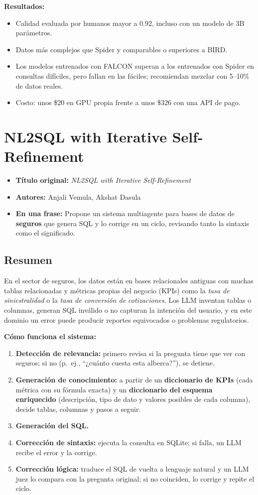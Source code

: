 \documentclass[11pt,a4paper]{article}
\newcommand{\ficha}[5]{%
  \begin{itemize}[leftmargin=*, label={}]
    \item \textbf{Título original:} \textit{#1}
    \item \textbf{Autores:} #2
    \item \textbf{En una frase:} #5
  \end{itemize}
}
\begin{document}
\textbf{Resultados:}
\begin{itemize}
  \item Calidad evaluada por humanos mayor a 0.92, incluso con un modelo de 3B parámetros.
  \item Datos más complejos que Spider y comparables o superiores a BIRD.
  \item Los modelos entrenados con FALCON superan a los entrenados con Spider en consultas difíciles, pero fallan en las fáciles; recomiendan mezclar con 5--10\% de datos reales.
  \item Costo: unos \$20 en GPU propia frente a unos \$326 con una API de pago.
\end{itemize}

\section{NL2SQL with Iterative Self-Refinement}
\ficha
  {NL2SQL with Iterative Self-Refinement}
  {Anjali Vemula, Akshat Dasula}
  {University of Minnesota -- Twin Cities}
  {arXiv:2610.22968 (preprint), octubre 2026}
  {Propone un sistema multiagente para bases de datos de \textbf{seguros} que genera SQL y lo corrige en un ciclo, revisando tanto la sintaxis como el significado.}

\subsection*{Resumen}
En el sector de seguros, los datos están en bases relacionales antiguas con muchas tablas relacionadas y métricas propias del negocio (KPIs) como la \textit{tasa de siniestralidad} o la \textit{tasa de conversión de cotizaciones}. Los LLM inventan tablas o columnas, generan SQL inválido o no capturan la intención del usuario, y en este dominio un error puede producir reportes equivocados o problemas regulatorios.

\textbf{Cómo funciona el sistema:}
\begin{enumerate}
  \item \textbf{Detección de relevancia:} primero revisa si la pregunta tiene que ver con seguros; si no (p.\ ej., ``¿cuánto cuesta esta alberca?''), se detiene.
  \item \textbf{Generación de conocimiento:} a partir de un \textbf{diccionario de KPIs} (cada métrica con su fórmula exacta) y un \textbf{diccionario del esquema enriquecido} (descripción, tipo de dato y valores posibles de cada columna), decide tablas, columnas y pasos a seguir.
  \item \textbf{Generación del SQL.}
  \item \textbf{Corrección de sintaxis:} ejecuta la consulta en SQLite; si falla, un LLM recibe el error y la corrige.
  \item \textbf{Corrección lógica:} traduce el SQL de vuelta a lenguaje natural y un LLM juez lo compara con la pregunta original; si no coinciden, lo corrige y repite el ciclo.
\end{enumerate}
\end{document}
